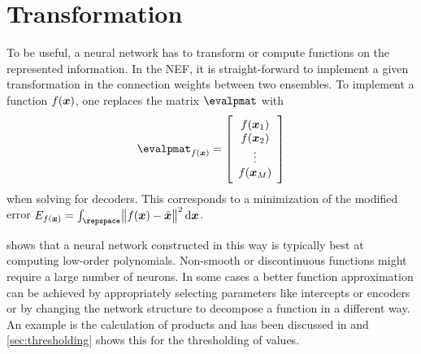 \section{Transformation}
To be useful, a neural network has to transform or compute functions on the represented information.
In the NEF, it is straight-forward to implement a given transformation in the connection weights between two ensembles.
To implement a function $f(\bm{x})$, one replaces the matrix $\evalpmat$ with
\begin{equation}
    \evalpmat_{f(\vc x)} = \sbr{\begin{array}{c}
            f(\vc x_1) \\ f(\vc x_2) \\ \vdots \\ f(\vc x_M)
    \end{array}}
\end{equation}
when solving for decoders.
This corresponds to a minimization of the modified error $E_{f(\vc x)} = \int_{\repspace} \norm{f(\vc x) - \hat{\vc x}}^2 \dif \vc x$.

\Textcite[Ch.~7]{eliasmith2003} shows that a neural network constructed in this way is typically best at computing low-order polynomials.
Non-smooth or discontinuous functions might require a large number of neurons.
In some cases a better function approximation can be achieved by appropriately selecting parameters like intercepts or encoders or by changing the network structure to decompose a function in a different way.
An example is the calculation of products and has been discussed in \textcite{gosmann2015-1} and \cref{sec:thresholding} shows this for the thresholding of values.

